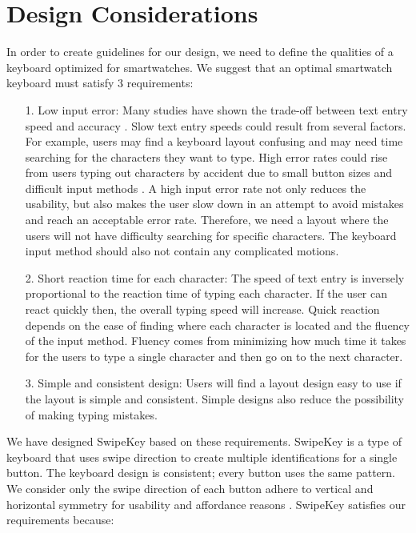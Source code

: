 \section{Design Considerations}

In order to create guidelines for our design, we need to define the qualities of a keyboard optimized for smartwatches. We suggest that an optimal smartwatch keyboard must satisfy 3 requirements:

    \begin{itemize}
    \item[1.]Low input error:\newline
    Many studies have shown the trade-off between text entry speed and accuracy \cite{speed-accuracy-trade-off,trade-off-in-aim-target}. Slow text entry speeds could result from several factors. For example, users may find a keyboard layout confusing and may need time searching for the characters they want to type. High error rates could rise from users typing out characters by accident due to small button sizes and difficult input methods \cite{target-size-for-thumb}. A high input error rate not only reduces the usability, but also makes the user slow down in an attempt to avoid mistakes and reach an acceptable error rate. Therefore, we need a layout where the users will not have difficulty searching for specific characters. The keyboard input method should also not contain any complicated motions.
    \item[2.]Short reaction time for each character:\newline
    The speed of text entry is inversely proportional to the reaction time of typing each character. If the user can react quickly then, the overall typing speed will increase. Quick reaction depends on the ease of finding where each character is located and the fluency of the input method. Fluency comes from minimizing how much time it takes for the users to type a single character and then go on to the next character.
    \item[3.]Simple and consistent design:\newline
    Users will find a layout design easy to use if the layout is simple and consistent. Simple designs also reduce the possibility of making typing mistakes.
    \end{itemize}
    
We have designed SwipeKey based on these requirements. SwipeKey is a type of keyboard that uses swipe direction to create multiple identifications for a single button. The keyboard design is consistent; every button uses the same pattern. We consider only the swipe direction of each button adhere to vertical and horizontal symmetry for usability and affordance reasons \cite{symmetry-for-design,symmetry-affordance}.
SwipeKey satisfies our requirements because: 
    
